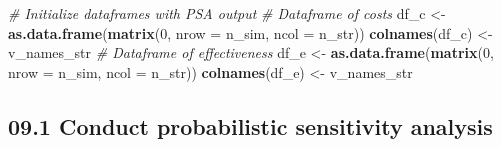 \documentclass[
]{article}
\newenvironment{Shaded}{\begin{snugshade}}{\end{snugshade}}
\newcommand{\CharTok}[1]{\textcolor[rgb]{0.31,0.60,0.02}{#1}}
\newcommand{\CommentTok}[1]{\textcolor[rgb]{0.56,0.35,0.01}{\textit{#1}}}
\newcommand{\ControlFlowTok}[1]{\textcolor[rgb]{0.13,0.29,0.53}{\textbf{#1}}}
\newcommand{\DataTypeTok}[1]{\textcolor[rgb]{0.13,0.29,0.53}{#1}}
\newcommand{\DecValTok}[1]{\textcolor[rgb]{0.00,0.00,0.81}{#1}}
\newcommand{\KeywordTok}[1]{\textcolor[rgb]{0.13,0.29,0.53}{\textbf{#1}}}
\newcommand{\NormalTok}[1]{#1}
\newcommand{\OperatorTok}[1]{\textcolor[rgb]{0.81,0.36,0.00}{\textbf{#1}}}
\newcommand{\StringTok}[1]{\textcolor[rgb]{0.31,0.60,0.02}{#1}}
\begin{document}
\begin{Shaded}
\begin{Highlighting}[]
\CommentTok{# Initialize dataframes with PSA output }
\CommentTok{# Dataframe of costs}
\NormalTok{df_c <-}\StringTok{ }\KeywordTok{as.data.frame}\NormalTok{(}\KeywordTok{matrix}\NormalTok{(}\DecValTok{0}\NormalTok{, }
                      \DataTypeTok{nrow =}\NormalTok{ n_sim,}
                      \DataTypeTok{ncol =}\NormalTok{ n_str))}
\KeywordTok{colnames}\NormalTok{(df_c) <-}\StringTok{ }\NormalTok{v_names_str}
\CommentTok{# Dataframe of effectiveness}
\NormalTok{df_e <-}\StringTok{ }\KeywordTok{as.data.frame}\NormalTok{(}\KeywordTok{matrix}\NormalTok{(}\DecValTok{0}\NormalTok{, }
                      \DataTypeTok{nrow =}\NormalTok{ n_sim,}
                      \DataTypeTok{ncol =}\NormalTok{ n_str))}
\KeywordTok{colnames}\NormalTok{(df_e) <-}\StringTok{ }\NormalTok{v_names_str}
\end{Highlighting}
\end{Shaded}

\hypertarget{conduct-probabilistic-sensitivity-analysis}{%
\subsection{09.1 Conduct probabilistic sensitivity
analysis}\label{conduct-probabilistic-sensitivity-analysis}}

\begin{Shaded}
\end{Shaded}
\end{document}

